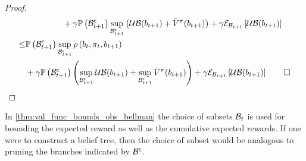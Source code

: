 \begin{proof}
\begin{align*}
\begin{split}
			&+\gamma\measure{\stcompI{\subSpace}{t+1}}\sup_{\stcompI{\subSpace}{t+1}}\left(\upperbound(\blf{t+1})+\bar{V}^\pi(\blf{t+1})\right)+\gamma\partialexpectation{\upperbound(\blf{t+1})}{\subSpaceI{t+1}}
		\end{split}\\
		\begin{split}
			\leq&\measure{\stcompI{\subSpace}{t+1}}\sup_{\stcompI{\subSpace}{t+1}}\reward{\blf{t},\pi_t,\blf{t+1}}\\
			&+\gamma\measure{\stcompI{\subSpace}{t+1}}\left(\sup_{\stcompI{\subSpace}{t+1}}\upperbound(\blf{t+1})+\sup_{\stcompI{\subSpace}{t+1}}\bar{V}^\pi(\blf{t+1})\right)+\gamma\partialexpectation{\upperbound(\blf{t+1})}{\subSpaceI{t+1}}\qed
		\end{split}
	\end{align*}
\end{proof}

In \autoref{thm:val_func_bounds_obs_bellman} the choice of subsets $\subSpaceI{t}$ is used for bounding the expected reward as well as the cumulative expected rewards. If one were to construct a belief tree, then the choice of subset would be analogous to pruning the branches indicated by $\stcomp{\subSpace}$.

